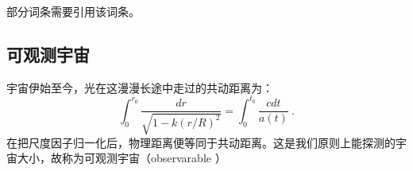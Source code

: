 
\begin{issues}
\issueTODO
部分词条需要引用该词条。
\end{issues}

\subsection{可观测宇宙}
宇宙伊始至今，光在这漫漫长途中走过的共动距离为：
\begin{equation}
\int_{0}^{r_{0}} \frac{d r}{\sqrt{1-k (r/R)^{2}}}=\int_{0}^{t_{0}} \frac{c d t}{a(t)}~.
\end{equation}
在把尺度因子归一化后，物理距离便等同于共动距离。这是我们原则上能探测的宇宙大小，故称为可观测宇宙（observarable ）
